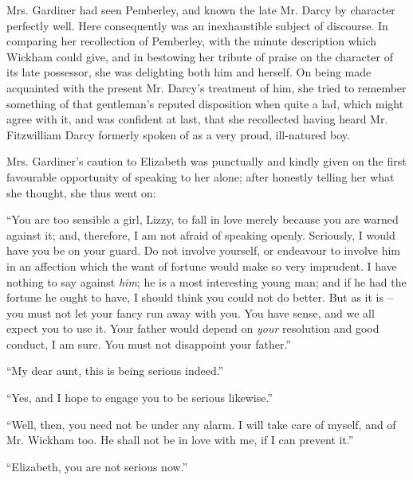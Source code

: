 Mrs. Gardiner had seen Pemberley, and known the late
Mr. Darcy by character perfectly well. Here consequently
was an inexhaustible subject of discourse. In comparing
her recollection of Pemberley, with the minute description
which Wickham could give, and in bestowing her tribute
of praise on the character of its late possessor, she was
delighting both him and herself. On being made acquainted
with the present Mr. Darcy’s treatment of him, she tried
to remember something of that gentleman’s reputed disposition
when quite a lad, which might agree with it, and
was confident at last, that she recollected having heard
Mr. Fitzwilliam Darcy formerly spoken of as a very proud,
ill-natured boy.


Mrs. Gardiner’s caution to Elizabeth was punctually
and kindly given on the first favourable opportunity of
speaking to her alone; after honestly telling her what
she thought, she thus went on:

“You are too sensible a girl, Lizzy, to fall in love
merely because you are warned against it; and, therefore,
I am not afraid of speaking openly. Seriously, I would
have you be on your guard. Do not involve yourself,
or endeavour to involve him in an affection which the
want of fortune would make so very imprudent. I have
nothing to say against \textit{him}; he is a most interesting
young man; and if he had the fortune he ought to have,
I should think you could not do better. But as it is -- you
must not let your fancy run away with you. You have
sense, and we all expect you to use it. Your father would
depend on \textit{your} resolution and good conduct, I am sure.
You must not disappoint your father.”

“My dear aunt, this is being serious indeed.”

“Yes, and I hope to engage you to be serious
likewise.”

“Well, then, you need not be under any alarm. I will
take care of myself, and of Mr. Wickham too. He shall
not be in love with me, if I can prevent it.”

“Elizabeth, you are not serious now.”

